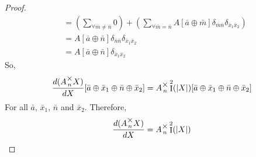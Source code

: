 \documentclass[12pt]{book}
\theoremstyle{definition}
\theoremstyle{plain}
\theoremstyle{ppart}
\theoremstyle{case}
\theoremstyle{solution}
\DeclareMathOperator{\Ident}{I}
\newcommand{\mmult}[1]{\text{\raisebox{1ex}{$\underset{#1}{\times}$}}}
\begin{document}
\begin{proof}
\begin{align*}
  &=
  \left(
    \sum_{\forall \bar{m} \ne \bar{n}} 0
  \right)
  +
  \left(
    \sum_{\forall \bar{m} = \bar{n}}
    A[\bar{a} \oplus \bar{m}]
    \delta_{\bar{m} \bar{n}}
    \delta_{\bar{x}_1 \bar{x}_2}
  \right) \\
  &=
  A[\bar{a} \oplus \bar{n}]
  \delta_{\bar{n} \bar{n}}
  \delta_{\bar{x}_1 \bar{x}_2} \\
  &=
  A[\bar{a} \oplus \bar{n}]
  \delta_{\bar{x}_1 \bar{x}_2}
\end{align*}
So, 
\[
  \frac{d(A\mmult{n}X)}{dX}[\bar{a} \oplus \bar{x}_1 \oplus \bar{n} \oplus \bar{x}_2]
  =
  A \mmult{n} \Ident^2(|X|)[\bar{a} \oplus \bar{x}_1 \oplus \bar{n} \oplus \bar{x}_2]
\]
For all $\bar{a}$, $\bar{x}_1$, $\bar{n}$ and $\bar{x}_2$. Therefore,
\[
  \frac{d(A\mmult{n}X)}{dX}
  =
  A \mmult{n} \Ident^2(|X|)
\]
\end{proof}
\end{document}
